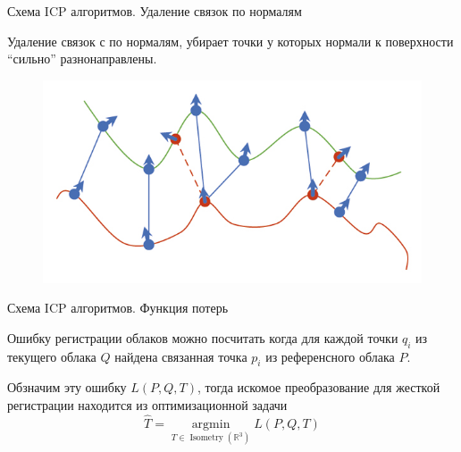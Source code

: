 \documentclass[6pt,pdf,utf8,russian]{beamer}
\begin{document}
\begin{frame}[fragile]{Схема ICP алгоритмов. Удаление связок по нормалям}
    \begin{block}{}
        Удаление связок с по нормалям, убирает точки у которых нормали к поверхности ``сильно'' разнонаправлены.
    \end{block}

    \pause

    \begin{block}{}
        \begin{figure}
            \includegraphics[]{images/correspondence_erasure_4.jpg}
        \end{figure}
    \end{block}

\end{frame}

\begin{frame}[fragile]{Схема ICP алгоритмов. Функция потерь}
    \begin{block}{}
        Ошибку регистрации облаков можно посчитать когда для каждой точки $q_i$ из текущего облака $Q$ найдена связанная
        точка $p_i$ из референсного облака $P$.
    \end{block}

    \pause

    \begin{block}{}
        Обзначим эту ошибку $L(P, Q, T)$, тогда искомое преобразование для жесткой регистрации находится из
        оптимизационной задачи
        \[
            \hat{T}=\operatorname{argmin}\limits_{T\in \operatorname{Isometry}(\mathbb{R}^3)} L(P, Q, T)
        \]
    \end{block}

\end{frame}
\end{document}
